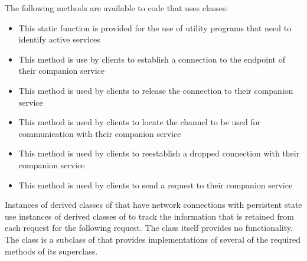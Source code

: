 The following methods are available to code that uses 
classes:
\begin{itemize}
\item{} This static function is provided for the use of
utility programs that need to identify active services
\item\exSp{} This method is use by clients to establish a
connection to the endpoint of their companion service
\item\exSp{} This method is used by clients to release the
connection to their companion service
\item\exSp{} This method is used by clients to locate the channel to
be used for communication with their companion service
\item\exSp{} This method is used by clients to
re\longDash{}establish a dropped connection with their companion service
\item\exSp{} This method is used by clients to send a request to their
companion service
\end{itemize}
Instances of derived classes of  that have \yarp{}
network connections with persistent state use instances of
derived classes of  to track the information that is
retained from each request for the following request.
The  class itself provides no functionality.
The  class is a subclass of
 that provides implementations of several of
the required methods of its superclass.\\

